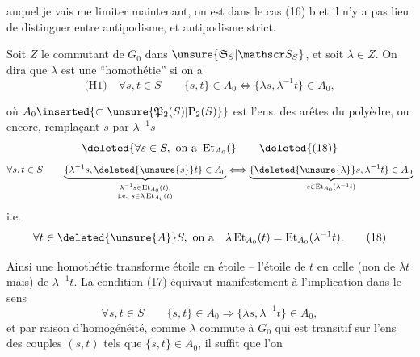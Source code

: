 auquel je vais me limiter maintenant, on est dans le cas (16) b et il n'y a pas lieu de distinguer entre antipodisme, et antipodisme strict.

Soit $Z$ le commutant de $G_0$ dans $\unsure{\mathfrak S_S|\mathscr S_S}$,  et soit $\lambda\in Z$. On dira que $\lambda$ est une ``homothétie'' si on a
\[
\text{(H1)}\quad\forall s,t\in S\qquad\{s,t\}\in A_0\Longleftrightarrow
\{\lambda s,\lambda^{-1}t\}\in A_0,\tag*{(17)}
\]

où $A_0\inserted{\subset\unsure{\mathfrak P_2(S)|\mathrm P_2(S)}}$ est l'ens. des arêtes du polyèdre,  ou encore, remplaçant  $s$ par $\lambda^{-1}s$
\[
\deleted{\forall s\in S,\ \text{on a }\operatorname{Et}_{A_0}(}\tag*{\deleted{(18)}}
\]
\[
\begin{aligned}
\forall s,t\in S\qquad
\underbrace{\{\lambda^{-1}s,\deleted{\unsure{s}}t\}\in A_0}_{\substack{\lambda^{-1}s\in\operatorname{Et}_{A_0}(t),\\\text{i.e. }s\in\lambda\operatorname{Et}_{A_0}(t)}}
\Longleftrightarrow
\underbrace{\{\deleted{\unsure{\lambda}}s,\lambda^{-1}t\}\in A_0}_{s\in\operatorname{Et}_{A_0}(\lambda^{-1}t)}
\end{aligned}
\]
i.e.
\[
\forall t\in\deleted{\unsure{A}}S,\ \text{on a}\quad
\lambda\operatorname{Et}_{A_0}(t)=\operatorname{Et}_{A_0}(\lambda^{-1}t).\tag*{(18)}
\]

Ainsi une homothétie transforme étoile en étoile -- l'étoile de $t$ en celle (non de $\lambda t$ mais) de $\lambda^{-1}t$. La condition (17) équivaut manifestement à l'implication dans le sens
\[
\forall s,t\in S\qquad\{s,t\}\in A_0\Longrightarrow\{\lambda s,\lambda^{-1}t\}\in A_0,\tag*{(17')}
\]
et par raison d'homogénéité, comme $\lambda$ commute à $G_0$ qui est transitif sur l'ens des couples $(s,t)$ tels que $\{s,t\}\in A_0$, il suffit que l'on

